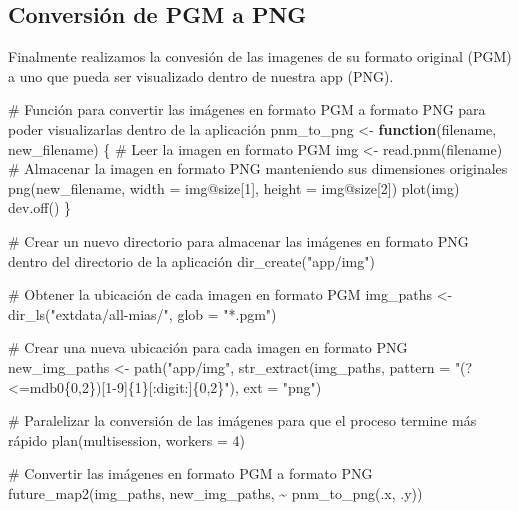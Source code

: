 \documentclass[
]{article}
\newenvironment{Shaded}{\begin{snugshade}}{\end{snugshade}}
\newcommand{\AttributeTok}[1]{\textcolor[rgb]{0.00,0.34,0.68}{#1}}
\newcommand{\CommentTok}[1]{\textcolor[rgb]{0.54,0.53,0.53}{#1}}
\newcommand{\ControlFlowTok}[1]{\textcolor[rgb]{0.12,0.11,0.11}{\textbf{#1}}}
\newcommand{\DecValTok}[1]{\textcolor[rgb]{0.69,0.50,0.00}{#1}}
\newcommand{\FunctionTok}[1]{\textcolor[rgb]{0.39,0.29,0.61}{#1}}
\newcommand{\NormalTok}[1]{\textcolor[rgb]{0.12,0.11,0.11}{#1}}
\newcommand{\OtherTok}[1]{\textcolor[rgb]{0.00,0.43,0.16}{#1}}
\newcommand{\SpecialCharTok}[1]{\textcolor[rgb]{0.24,0.68,0.91}{#1}}
\newcommand{\StringTok}[1]{\textcolor[rgb]{0.75,0.01,0.01}{#1}}
\begin{document}
\hypertarget{conversiuxf3n-de-pgm-a-png}{%
\subsection{Conversión de PGM a PNG}\label{conversiuxf3n-de-pgm-a-png}}

Finalmente realizamos la convesión de las imagenes de su formato
original (PGM) a uno que pueda ser visualizado dentro de nuestra app
(PNG).

\begin{Shaded}
\begin{Highlighting}[]
\CommentTok{\# Función para convertir las imágenes en formato PGM a formato PNG para poder visualizarlas dentro de la aplicación}
\NormalTok{pnm\_to\_png }\OtherTok{\textless{}{-}} \ControlFlowTok{function}\NormalTok{(filename, new\_filename) \{}
  \CommentTok{\# Leer la imagen en formato PGM}
\NormalTok{  img }\OtherTok{\textless{}{-}} \FunctionTok{read.pnm}\NormalTok{(filename)}
  \CommentTok{\# Almacenar la imagen en formato PNG manteniendo sus dimensiones originales}
  \FunctionTok{png}\NormalTok{(new\_filename, }\AttributeTok{width =}\NormalTok{ img}\SpecialCharTok{@}\NormalTok{size[}\DecValTok{1}\NormalTok{], }\AttributeTok{height =}\NormalTok{ img}\SpecialCharTok{@}\NormalTok{size[}\DecValTok{2}\NormalTok{])}
  \FunctionTok{plot}\NormalTok{(img)}
  \FunctionTok{dev.off}\NormalTok{()}
\NormalTok{\}}

\CommentTok{\# Crear un nuevo directorio para almacenar las imágenes en formato PNG dentro del directorio de la aplicación}
\FunctionTok{dir\_create}\NormalTok{(}\StringTok{"app/img"}\NormalTok{)}

\CommentTok{\# Obtener la ubicación de cada imagen en formato PGM}
\NormalTok{img\_paths }\OtherTok{\textless{}{-}} \FunctionTok{dir\_ls}\NormalTok{(}\StringTok{"extdata/all{-}mias/"}\NormalTok{, }\AttributeTok{glob =} \StringTok{"*.pgm"}\NormalTok{)}

\CommentTok{\# Crear una nueva ubicación para cada imagen en formato PNG}
\NormalTok{new\_img\_paths }\OtherTok{\textless{}{-}} \FunctionTok{path}\NormalTok{(}\StringTok{"app/img"}\NormalTok{, }\FunctionTok{str\_extract}\NormalTok{(img\_paths, }\AttributeTok{pattern =} \StringTok{"(?\textless{}=mdb0\{0,2\})[1{-}9]\{1\}[:digit:]\{0,2\}"}\NormalTok{), }\AttributeTok{ext =} \StringTok{"png"}\NormalTok{)}

\CommentTok{\# Paralelizar la conversión de las imágenes para que el proceso termine más rápido}
\FunctionTok{plan}\NormalTok{(multisession, }\AttributeTok{workers =} \DecValTok{4}\NormalTok{)}

\CommentTok{\# Convertir las imágenes en formato PGM a formato PNG}
\FunctionTok{future\_map2}\NormalTok{(img\_paths, new\_img\_paths, }\SpecialCharTok{\textasciitilde{}} \FunctionTok{pnm\_to\_png}\NormalTok{(.x, .y))}
\end{Highlighting}
\end{Shaded}
\end{document}
